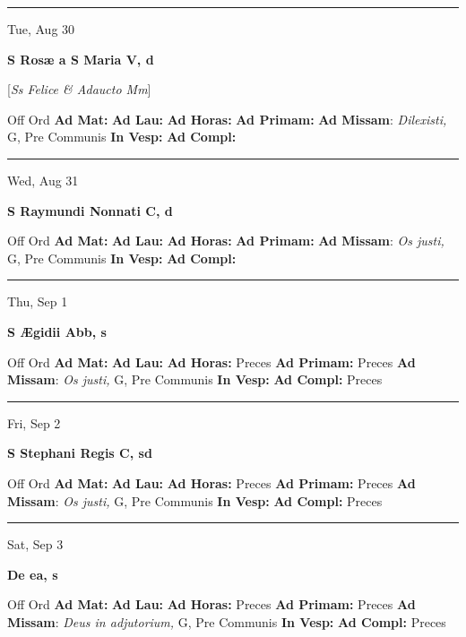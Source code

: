 \documentclass[letterpaper, 10pt]{article}
\begin{document}
\hrule
\begin{center}
Tue, Aug 30
\end{center}\textbf{ \large S Rosæ a S Maria V, \textnormal{\normalsize d}}

[\textit{Ss Felice \& Adaucto Mm}]
\begin{justify}
Off Ord
\textbf{Ad Mat: }
\textbf{Ad Lau: }
\textbf{Ad Horas: }
\textbf{Ad Primam: }
\textbf{Ad Missam}: \textit{Dilexisti,} G, Pre Communis
\textbf{In Vesp: }
\textbf{Ad Compl: }\end{justify}



\hrule
\begin{center}
Wed, Aug 31
\end{center}\textbf{ \large S Raymundi Nonnati C, \textnormal{\normalsize d}}
\begin{justify}
Off Ord
\textbf{Ad Mat: }
\textbf{Ad Lau: }
\textbf{Ad Horas: }
\textbf{Ad Primam: }
\textbf{Ad Missam}: \textit{Os justi,} G, Pre Communis
\textbf{In Vesp: }
\textbf{Ad Compl: }\end{justify}



\hrule
\begin{center}
Thu, Sep 1
\end{center}\textbf{ \large S Ægidii Abb, \textnormal{\normalsize s}}
\begin{justify}
Off Ord
\textbf{Ad Mat: }
\textbf{Ad Lau: }
\textbf{Ad Horas: }Preces
\textbf{Ad Primam: }Preces
\textbf{Ad Missam}: \textit{Os justi,} G, Pre Communis
\textbf{In Vesp: }
\textbf{Ad Compl: }Preces\end{justify}



\hrule
\begin{center}
Fri, Sep 2
\end{center}\textbf{ \large S Stephani Regis C, \textnormal{\normalsize sd}}
\begin{justify}
Off Ord
\textbf{Ad Mat: }
\textbf{Ad Lau: }
\textbf{Ad Horas: }Preces
\textbf{Ad Primam: }Preces
\textbf{Ad Missam}: \textit{Os justi,} G, Pre Communis
\textbf{In Vesp: }
\textbf{Ad Compl: }Preces\end{justify}



\hrule
\begin{center}
Sat, Sep 3
\end{center}\textbf{ \large De ea, \textnormal{\normalsize s}}
\begin{justify}
Off Ord
\textbf{Ad Mat: }
\textbf{Ad Lau: }
\textbf{Ad Horas: }Preces
\textbf{Ad Primam: }Preces
\textbf{Ad Missam}: \textit{Deus in adjutorium,} G, Pre Communis
\textbf{In Vesp: }
\textbf{Ad Compl: }Preces\end{justify}
\end{document}
